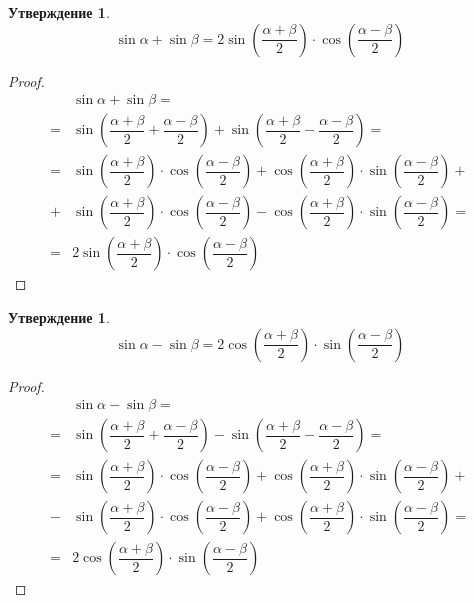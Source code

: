 \documentclass[12pt]{article}
\theoremstyle{definition}
\newtheorem{statement}[theorem]{Утверждение}
\begin{document}
    \begin{statement}
        $$\sin\alpha+\sin\beta=2\sin\left(\dfrac{\alpha+\beta}{2}\right)\cdot\cos\left(\dfrac{\alpha-\beta}{2}\right)$$
    \end{statement}
    \begin{proof}
        \begin{align*}
            &\sin\alpha+\sin\beta=\\
            =&\sin\left(\dfrac{\alpha+\beta}{2}+\dfrac{\alpha-\beta}{2}\right)+\sin\left(\dfrac{\alpha+\beta}{2}-\dfrac{\alpha-\beta}{2}\right)=\\
            =&\sin\left(\dfrac{\alpha+\beta}{2}\right)\cdot\cos\left(\dfrac{\alpha-\beta}{2}\right)+\cos\left(\dfrac{\alpha+\beta}{2}\right)\cdot\sin\left(\dfrac{\alpha-\beta}{2}\right)+\\
            +&\sin\left(\dfrac{\alpha+\beta}{2}\right)\cdot\cos\left(\dfrac{\alpha-\beta}{2}\right)-\cos\left(\dfrac{\alpha+\beta}{2}\right)\cdot\sin\left(\dfrac{\alpha-\beta}{2}\right)=\\
            =&2\sin\left(\dfrac{\alpha+\beta}{2}\right)\cdot\cos\left(\dfrac{\alpha-\beta}{2}\right)
        \end{align*}
    \end{proof}
    \begin{statement}
        $$\sin\alpha-\sin\beta=2\cos\left(\dfrac{\alpha+\beta}{2}\right)\cdot\sin\left(\dfrac{\alpha-\beta}{2}\right)$$
    \end{statement}
    \begin{proof}
        \begin{align*}
            &\sin\alpha-\sin\beta=\\
            =&\sin\left(\dfrac{\alpha+\beta}{2}+\dfrac{\alpha-\beta}{2}\right)-\sin\left(\dfrac{\alpha+\beta}{2}-\dfrac{\alpha-\beta}{2}\right)=\\
            =&\sin\left(\dfrac{\alpha+\beta}{2}\right)\cdot\cos\left(\dfrac{\alpha-\beta}{2}\right)+\cos\left(\dfrac{\alpha+\beta}{2}\right)\cdot\sin\left(\dfrac{\alpha-\beta}{2}\right)+\\
            -&\sin\left(\dfrac{\alpha+\beta}{2}\right)\cdot\cos\left(\dfrac{\alpha-\beta}{2}\right)+\cos\left(\dfrac{\alpha+\beta}{2}\right)\cdot\sin\left(\dfrac{\alpha-\beta}{2}\right)=\\
            =&2\cos\left(\dfrac{\alpha+\beta}{2}\right)\cdot\sin\left(\dfrac{\alpha-\beta}{2}\right)
        \end{align*}
    \end{proof}
\end{document}
